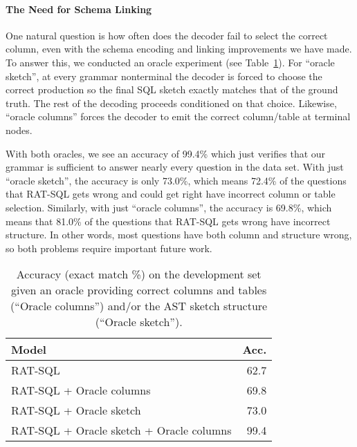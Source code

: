 \documentclass[11pt,a4paper,final]{article}
\begin{document}
\paragraph{The Need for Schema Linking}
One natural question is how often does the decoder fail to select the correct column, even with the schema encoding and linking improvements we have made.
To answer this, we conducted an oracle experiment (see Table~\ref{table:oracle}).
For ``oracle sketch'', at every grammar nonterminal the decoder is forced to choose the correct production so the final SQL
sketch exactly matches that of the ground truth.
The rest of the decoding proceeds conditioned on that choice.
Likewise, ``oracle columns'' forces the decoder to emit the correct column/table at terminal nodes.

With both oracles, we see an accuracy of 99.4\% which just verifies that our grammar is sufficient to answer nearly
every question in the data set.
With just ``oracle sketch'', the accuracy is only 73.0\%, which means 72.4\% of the questions that RAT-SQL gets wrong
and could get right have incorrect column or table selection.
Similarly, with just ``oracle columns'', the accuracy is 69.8\%, which means that 81.0\% of the questions that RAT-SQL gets
wrong have incorrect structure.
In other words, most questions have both column and structure wrong, so both problems require important future work.

\begin{table}[t]
    \centering
    \small
    \begin{tabular}{lr}
        \toprule
        \bfseries Model & \bfseries Acc. \\
        \midrule
        RAT-SQL & 62.7 \\
        RAT-SQL + Oracle columns & 69.8 \\
        RAT-SQL + Oracle sketch & 73.0 \\
        RAT-SQL + Oracle sketch + Oracle columns & 99.4 \\
        \bottomrule
    \end{tabular}
    \caption{Accuracy (exact match \%) on the development set given an oracle providing correct columns and tables
        (``Oracle columns'') and/or the AST sketch structure (``Oracle sketch'').
    }
    \vspace{-\baselineskip}
    \label{table:oracle}
\end{table}
\end{document}
